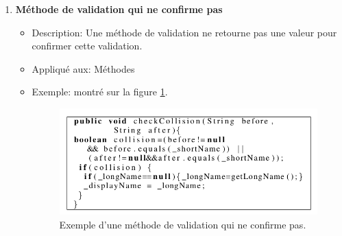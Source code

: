 \begin{enumerate}
\item \textbf {Méthode de validation qui ne confirme pas}
\begin{itemize}
\item Description: Une méthode de validation ne retourne pas une valeur pour confirmer cette validation.
\item Appliqué aux: Méthodes
\item Exemple: montré sur la figure \ref{fig:deux_deux}.
\begin{figure}[H]
	\centering
\includegraphics[width=0.9\linewidth]{Others/Resources/deux_deux.png}
	\caption{Exemple d'une méthode de validation qui ne confirme pas\cite{arnaoudova2013new}.}
		\label{fig:deux_deux}
	\end{figure}


\end{itemize}
\end{enumerate}
